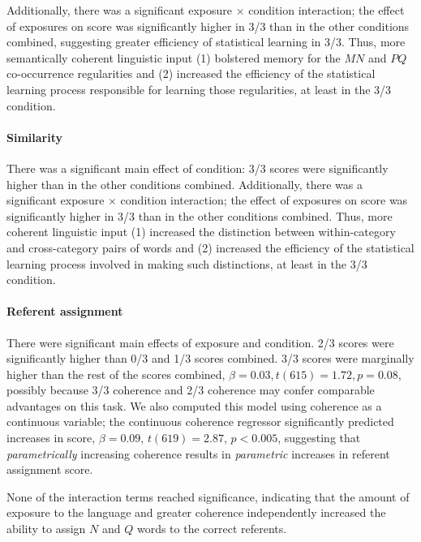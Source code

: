 \documentclass[man,floatsintext]{apa6}
\begin{document}
Additionally, there was a significant exposure $\times$ condition
interaction; the effect of exposures on score was significantly higher
in 3/3 than in the other conditions combined, suggesting greater
efficiency of statistical learning in 3/3. Thus, more semantically
coherent linguistic input (1) bolstered memory for the $MN$ and $PQ$
co-occurrence regularities and (2) increased the efficiency of the
statistical learning process responsible for learning those
regularities, at least in the 3/3 condition.

\paragraph{Similarity}
There was a significant main effect of condition: 3/3 scores were
significantly higher than in the other conditions
combined. Additionally, there was a significant exposure $\times$
condition interaction; the effect of exposures on score was
significantly higher in 3/3 than in the other conditions
combined. Thus, more coherent linguistic input (1) increased the
distinction between within-category and cross-category pairs of words
and (2) increased the efficiency of the statistical learning process
involved in making such distinctions, at least in the 3/3 condition.

\paragraph{Referent assignment}

There were significant main effects of exposure and condition. 2/3
scores were significantly higher than 0/3 and 1/3 scores combined. 3/3
scores were marginally higher than the rest of the scores combined,
$\beta = 0.03, t(615) = 1.72, p = 0.08$, possibly because 3/3
coherence and 2/3 coherence may confer comparable advantages on this
task. We also computed this model using coherence as a continuous
variable; the continuous coherence regressor significantly predicted
increases in score, $\beta = 0.09$, $t(619) = 2.87$, $p < 0.005$,
suggesting that \emph{parametrically} increasing coherence results in
\emph{parametric} increases in referent assignment score.

None of the interaction terms reached significance, indicating that
the amount of exposure to the language and greater coherence
independently increased the ability to assign $N$ and $Q$ words to the
correct referents.

\end{document}
